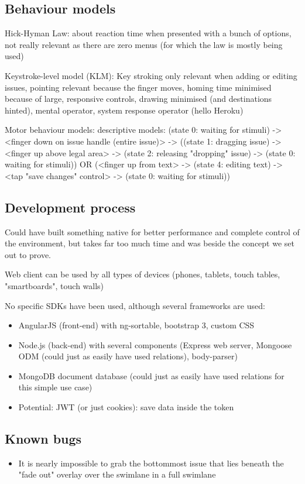 \subsection{Behaviour models}

Hick-Hyman Law: about reaction time when presented with a bunch of options, not really relevant as there are zero menus (for which the law is mostly being used)

Keystroke-level model (KLM): Key stroking only relevant when adding or editing issues, pointing relevant because the finger moves, homing time minimised because of large, responsive controls, drawing minimised (and destinations hinted), mental operator, system response operator (hello Heroku) %

Motor behaviour models: descriptive models: (state 0: waiting for stimuli) -> <finger down on issue handle (entire issue)> -> ((state 1: dragging issue) -> <finger up above legal area> -> (state 2: releasing "dropping" issue) -> (state 0: waiting for stimuli)) OR (<finger up from text> -> (state 4: editing text) -> <tap "save changes" control> -> (state 0: waiting for stimuli))

\subsection{Development process}

Could have built something native for better performance and complete control of the environment, but takes far too much time and was beside the concept we set out to prove.

Web client can be used by all types of devices (phones, tablets, touch tables, "smartboards", touch walls)

No specific SDKs have been used, although several frameworks are used:
\begin{itemize}
  \item AngularJS (front-end) with ng-sortable, bootstrap 3, custom CSS
  \item Node.js (back-end) with several components (Express web server, Mongoose ODM (could just as easily have used relations), body-parser)
  \item MongoDB document database (could just as easily have used relations for this simple use case)
  \item Potential: JWT (or just cookies): save data inside the token
\end{itemize}




\subsection{Known bugs}

\begin{itemize}
  \item It is nearly impossible to grab the bottommost issue that lies beneath the "fade out" overlay over the swimlane in a full swimlane
\end{itemize}
